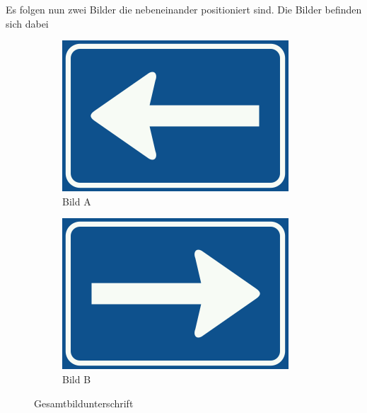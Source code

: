 \documentclass{scrreprt}
\begin{document}
Es folgen nun zwei Bilder die nebeneinander positioniert sind. Die Bilder befinden sich dabei
\vspace{10pt}
\begin{figure}[h!]
	\centering
	\begin{subfigure}{.5\textwidth}
		\centering
		\includegraphics[width=.9\linewidth]{images/Nederlands_verkeersbord_C4_(links).png}
		\caption{Bild A}
		
	\end{subfigure}%
	\begin{subfigure}{.5\textwidth}
		\centering
		\includegraphics[width=.9\linewidth]{images/Nederlands_verkeersbord_C4_(rechts).png}
		\caption{Bild B}
		
	\end{subfigure}
	\caption{Gesamtbildunterschrift}

\end{figure}
\end{document}

